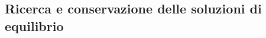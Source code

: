 \subsection{Ricerca e conservazione delle soluzioni di equilibrio}
\label{sec:esercizi-equazioni-differenziali-soluzioni-di-equilibrio}
